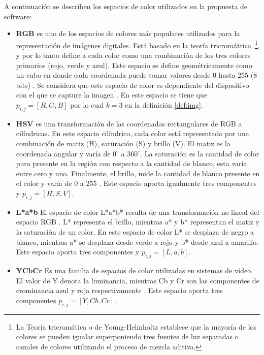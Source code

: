 A continuación se describen los espacios de color utilizados en la propuesta de software:

\begin{itemize}
	\item \textbf{RGB} es uno de los espacios de colores más populares utilizados para la representación de imágenes digitales. Está basado en la teoría tricromátrica~\footnote{La Teoría tricromática o de Young-Helmholtz establece que la mayoría de los colores se pueden igualar superponiendo tres fuentes de luz separadas o canales de colores utilizando el proceso de mezcla aditiva.}, y por lo tanto define a cada color como una combinación de los tres colores primarios (rojo, verde y azul). Este espacio se define geométricamente como un cubo en donde cada coordenada puede tomar valores desde 0 hasta 255 (8 bits) \cite{sangwine1998colour}. Se considera que este espacio de color es dependiente del dispositivo con el que se capture la imagen \cite{tkalcic2003colour, ruela2013role}. En este espacio se tiene que $p_{i, j} = [R, G, B]$ por lo cual $k=3$ en la definición \ref{def:img}.
	
	\item \textbf{HSV} es una transformación de las coordenadas rectangulares de RGB a cilíndricas. En este espacio cilíndrico, cada color está representado por una combinación de matiz (H), saturación (S) y brillo (V). El matiz es la coordenada angular y varía de $0^{\circ}$ a $360^{\circ}$. La saturación es la cantidad de color puro presente en la región con respecto a la cantidad de blanco, esta varía entre cero y uno. Finalmente, el brillo, mide la cantidad de blanco presente en el color y varía de 0 a 255 \cite{ruela2013role}. Este espacio aporta igualmente tres componentes y $p_{i, j} = [H, S, V]$.
	
	\item \textbf{L*a*b} El espacio de color L*a*b* resulta de una transformación no lineal del espacio RGB \cite{bradski2000opencv}. L* representa el brillo, mientras a* y b* representan el matiz y la saturación de un color. En este espacio de color L* se desplaza de negro a blanco, mientras a* se desplaza desde verde a rojo y b* desde azul a amarillo. Este espacio aporta tres componentes y $p_{i, j} = [L, a, b]$.
	
	\item \textbf{YCbCr} Es una familia de espacios de color utilizadas en sistemas de vídeo. El valor de Y denota la luminancia, mientras Cb y Cr son las componentes de crominancia azul y roja respectivamente \cite{sergyan2007color}. Este espacio aporta tres componentes $p_{i, j} = [Y, Cb, Cr]$.
\end{itemize}

